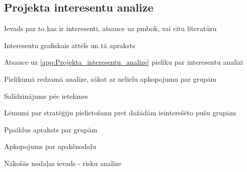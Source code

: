 \subsection{Projekta interesentu analize}
Ievads par to kas ir interesenti, atsauce uz pmbok, vai citu literatūru
\par
Interesentu grafiskais attēls un tā apraksts
\par
Atsauce uz \ref{app:Projekta_interesentu_analize} pieliku par interesentu analīzi
\par
Pielikumā redzamā analīze, sākot ar nelielu apkopojumu par grupām
\par
Salīdzinājums pēc ietekmes
\par
Lēmumi par stratēģiju pielietošanu pret dažādām ieinterešēto pušu grupām
\par
Ppaildus apraksts par grupām
\par
Apkopojums par apakšnodaļu
\par
Nākošās nodaļas ievads - risku analīze
